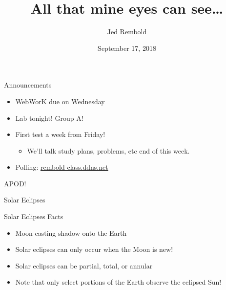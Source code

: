 \documentclass[pdf,aspectratio=169]{beamer}
\title{All that mine eyes can see\ldots}
\date{September 17, 2018}
\author{Jed Rembold}
\begin{document}
\renewcommand*{\theenumi}{\Alph{enumi}}

\begin{frame}{Announcements}
	\begin{itemize}
	  \item WebWorK due on Wednesday
	  \item Lab tonight! Group A!
	  \item First test a week from Friday!
		\begin{itemize}
		  \item We'll talk study plans, problems, etc end of this week.
		\end{itemize}
	  \item Polling: \url{rembold-class.ddns.net}
	\end{itemize}
\end{frame}

\begin{frame}{APOD!}
  \begin{center}
  \end{center}
\end{frame}

\begin{frame}{Solar Eclipses}
  \begin{center}
  \end{center}
\end{frame}

\begin{frame}{Solar Eclipses Facts}
  \begin{itemize}
	\item Moon casting shadow onto the Earth
	\item Solar eclipses can only occur when the Moon is new!
	\item Solar eclipses can be partial, total, or annular
	\item Note that only select portions of the Earth observe the eclipsed Sun!
  \end{itemize}
  \begin{center}
	
  \end{center}
\end{frame}
\end{document}
